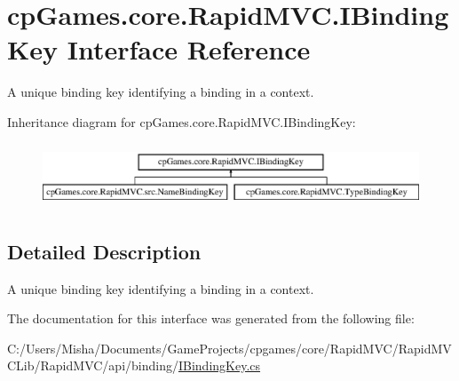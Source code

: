 \hypertarget{interfacecp_games_1_1core_1_1_rapid_m_v_c_1_1_i_binding_key}{}\section{cp\+Games.\+core.\+Rapid\+M\+V\+C.\+I\+Binding\+Key Interface Reference}
\label{interfacecp_games_1_1core_1_1_rapid_m_v_c_1_1_i_binding_key}


A unique binding key identifying a binding in a context.  


Inheritance diagram for cp\+Games.\+core.\+Rapid\+M\+V\+C.\+I\+Binding\+Key\+:\begin{figure}[H]
\begin{center}
\leavevmode
\includegraphics[height=1.937716cm]{interfacecp_games_1_1core_1_1_rapid_m_v_c_1_1_i_binding_key}
\end{center}
\end{figure}


\subsection{Detailed Description}
A unique binding key identifying a binding in a context. 



The documentation for this interface was generated from the following file\+:\begin{DoxyCompactItemize}
\item 
C\+:/\+Users/\+Misha/\+Documents/\+Game\+Projects/cpgames/core/\+Rapid\+M\+V\+C/\+Rapid\+M\+V\+C\+Lib/\+Rapid\+M\+V\+C/api/binding/\mbox{\hyperlink{_i_binding_key_8cs}{I\+Binding\+Key.\+cs}}\end{DoxyCompactItemize}
